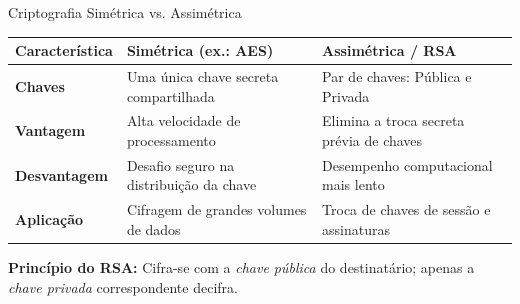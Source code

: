 \documentclass[aspectratio=169, 10pt]{beamer}
\begin{document}
\begin{frame}{Criptografia Simétrica vs. Assimétrica}
    \begin{table}
        \centering
        \begin{tabular}{lp{5.5cm}p{5.5cm}}
            \toprule
            \textbf{Característica} & \textbf{Simétrica (ex.: AES)} & \textbf{Assimétrica / RSA} \\
            \midrule
            \textbf{Chaves} & Uma única chave secreta compartilhada & Par de chaves: Pública e Privada \\
            \textbf{Vantagem} & Alta velocidade de processamento & Elimina a troca secreta prévia de chaves \\
            \textbf{Desvantagem} & Desafio seguro na distribuição da chave & Desempenho computacional mais lento \\
            \textbf{Aplicação} & Cifragem de grandes volumes de dados & Troca de chaves de sessão e assinaturas \\
            \bottomrule
        \end{tabular}
    \end{table}
    \vspace{0.3cm}
    \centering
    \textbf{Princípio do RSA:} Cifra-se com a \textit{chave pública} do destinatário; apenas a \textit{chave privada} correspondente decifra.
\end{frame}
\end{document}
